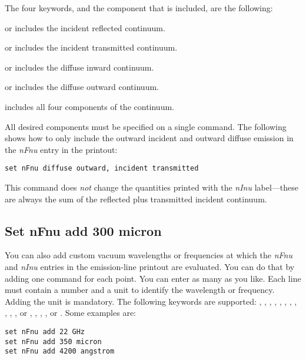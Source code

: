 The four keywords, and the component that is included, are the following:

  or  includes
the incident reflected continuum.

  or  includes
the incident transmitted continuum.

  or  includes the diffuse
inward continuum.

  or  includes the
diffuse outward continuum.

  includes all four components of the continuum.

All desired components must be specified on a single  command.
The following
shows how to only include the outward incident and outward diffuse emission
in the \emph{nFnu} entry in the printout:
\begin{verbatim}
set nFnu diffuse outward, incident transmitted
\end{verbatim}

This command
does {\em not} change the quantities printed with the \emph{nInu} label---these
are always the sum of the reflected plus transmitted incident continuum.

\subsection{Set nFnu add 300 micron}
\label{sec:set:nfnu:add}

You can also add custom vacuum wavelengths or frequencies at which the \emph{nFnu}
and \emph{nInu} entries in the emission-line printout are evaluated. You can
do that by adding one  command for each point. You can
enter as many as you like. Each line must contain a number and a unit to identify
the wavelength or frequency. Adding the unit is mandatory. The following keywords
are supported: , , ,
, , , ,
, , , ,
 or , 
, , ,  or
.
Some examples are:
\begin{verbatim}
set nFnu add 22 GHz
set nFnu add 350 micron
set nFnu add 4200 angstrom
\end{verbatim}

